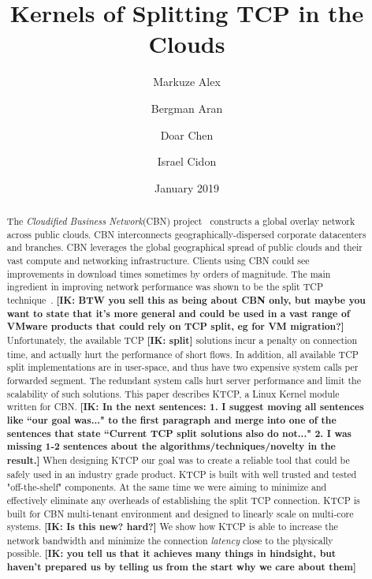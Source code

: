 \documentclass[newfonts=false,format=sigconf,10pt,letterpaper]{acmart}
\title{Kernels of Splitting TCP in the Clouds}
\author{Markuze Alex}
\affiliation{%
  \institution{VMware Research}
  \country{Israel}
}
\author{Bergman Aran}
\affiliation{%
  \institution{VMware Research}
  \country{Israel}
}
\author{Doar Chen}
\affiliation{%
  \institution{VMware Research}
  \country{Israel}
}
\author{Israel Cidon}
\affiliation{%
  \institution{VMware Research}
  \country{Palo Alto}
}
\date{January 2019}
\newcommand{\oursys}{KTCP\xspace}
\newcommand{\mycomm}[3]{{\footnotesize{{\color{#2} \textbf{[#1: #3]}}}}}
\newcommand{\IK}[1]{\mycomm{IK}{blue}{#1}}
\begin{document}
\begin{abstract}
The \emph{Cloudified Business Network}(CBN) project~\cite{Elastic, CDD} constructs a global overlay network across public clouds. CBN interconnects geographically-dispersed corporate datacenters and branches. CBN leverages the global geographical spread of public clouds and their vast compute and networking infrastructure.
Clients using CBN could see improvements in download times sometimes by orders of magnitude. The main ingredient in improving network performance was shown to be the split TCP technique~\cite{CDD, }. \IK{BTW you sell this as being about CBN only, but maybe you want to state that it's more general and could be used in a vast range of VMware products that could rely on TCP split, eg for VM migration?} Unfortunately, the available TCP \IK{split} solutions incur a penalty on connection time, and actually hurt the performance of short flows. In addition, all available TCP split implementations are in user-space, and thus have two expensive system calls per forwarded segment. The redundant system calls hurt server performance and limit the scalability of such solutions.
\newline
This paper describes \oursys, a Linux Kernel module written for CBN. \IK{In the next sentences: 1. I suggest moving all sentences like ``our goal was..." to the first paragraph and merge into one of the sentences that state ``Current TCP split solutions also do not..." 2. I was missing 1-2 sentences about the algorithms/techniques/novelty in the result.} When designing \oursys our goal was to create a reliable tool that could be safely used in an industry grade product.  \oursys is built with well trusted and tested "off-the-shelf" components. At the same time we were aiming to  minimize and effectively eliminate any overheads of establishing the split TCP connection. \oursys is built for CBN multi-tenant environment and designed to linearly scale on multi-core systems. \IK{Is this new? hard?} We show how \oursys is able to increase the network bandwidth and minimize the connection \emph{latency} close to the physically possible. \IK{you tell us that it achieves many things in hindsight, but haven't prepared us by telling us from the start why we care about them}

\end{abstract}

\maketitle








\end{document}

